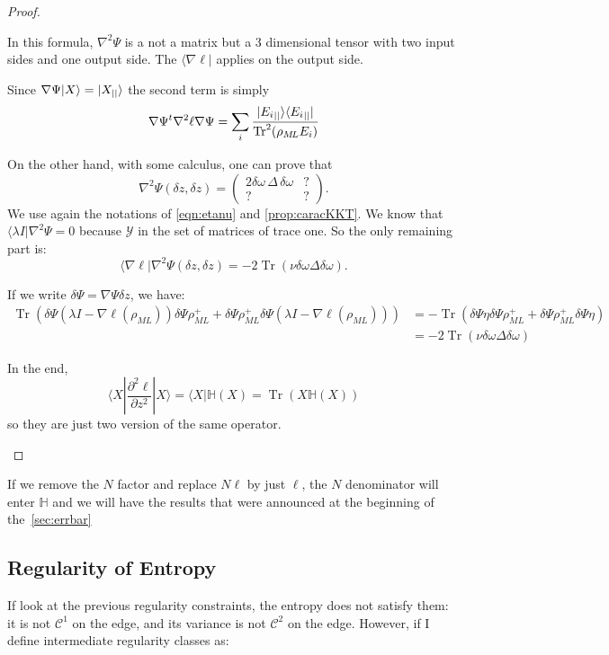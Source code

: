 \documentclass[10pt,a4paper]{report}
\theoremstyle{plain}
\theoremstyle{definition}
\theoremstyle{remark}
\newcommand{\ket}[1]{|#1\rangle}
\newcommand{\bra}[1]{\langle#1|}
\newcommand{\dparn}[3]{\frac{\partial^{#3} {#1}}{\partial{#2}^{#3}}}
\newcommand{\mat}[1]{\begin{pmatrix}#1\end{pmatrix}}
\DeclareMathOperator{\Tr}{Tr}
\newcommand{\class}[1]{{\mathscr{C}^{#1}}}
\newcommand{\ml}{_{M\!L}}
\begin{document}
\begin{proof}
\begin{itemize}
      In this formula, $\nabla^2 \Psi$ is a not a matrix but a 3 dimensional
      tensor with two input sides and one output side. The $\bra{\nabla \ell}$
      applies on the output side.

      Since $\nabla \Psi \ket X = \ket {X\pr}$ the second term is simply
      \[\nabla \Psi^t
        \nabla^2 \ell \nabla \Psi = \sum_i
        \frac{\ket{{E_i}\pr}\bra{{E_i}\pr}} {\Tr^2(\rho\ml E_i)} \]

      On the other hand, with some calculus, one
      can prove that
      \[ \nabla^2\Psi(\delta z, \delta z) = \mat{2\delta \omega\, \Delta\, \delta
          \omega & ? \\ ? & ?}.\]
      We use again the notations of \cref{eqn:etanu} and
      \cref{prop:caracKKT}. We know that $\bra {\lambda I} \nabla^2 \Psi = 0$
      because $\mathcal{Y}$ in the set of matrices of trace one. So the only
      remaining part is:
      \[\bra {\nabla \ell} \nabla^2\Psi(\delta z, \delta z) = -2\Tr(\nu \delta
        \omega \Delta \delta \omega). \]

      If we write $\delta \Psi = \nabla \Psi \delta z$, we have:
      \begin{align*}
        \Tr(\delta\Psi (\lambda I - \nabla \ell(\rho\ml))\delta\Psi\rho\ml^+ +
        \delta\Psi \rho\ml^+\delta\Psi(\lambda I - \nabla \ell(\rho\ml)))
        &= - \Tr(\delta\Psi \eta\delta\Psi\rho\ml^+ +
          \delta\Psi \rho\ml^+\delta\Psi\eta)\\
        &= -2\Tr(\nu \delta
        \omega \Delta \delta \omega)
      \end{align*}

      In the end,
      \[\bra X \dparn \ell z 2 \ket X = \bra X \mathbb H(X) = \Tr(X \mathbb H(X))\]
      so they are just two version of the same operator.
  \end{itemize}

\end{proof}


If we remove the $N$ factor and replace $N\ell$ by just $\ell$, the $N$
denominator will enter $\mathbb H$ and we will have the results that were announced at
the beginning of the~\cref{sec:errbar}

\subsection{Regularity of Entropy}\label{sec:regentropy}

If look at the previous regularity constraints, the entropy does not satisfy
them: it is not $\class 1$ on the edge, and its variance is not $\class 2$ on
the edge. However, if I define intermediate regularity classes as:
\end{document}
